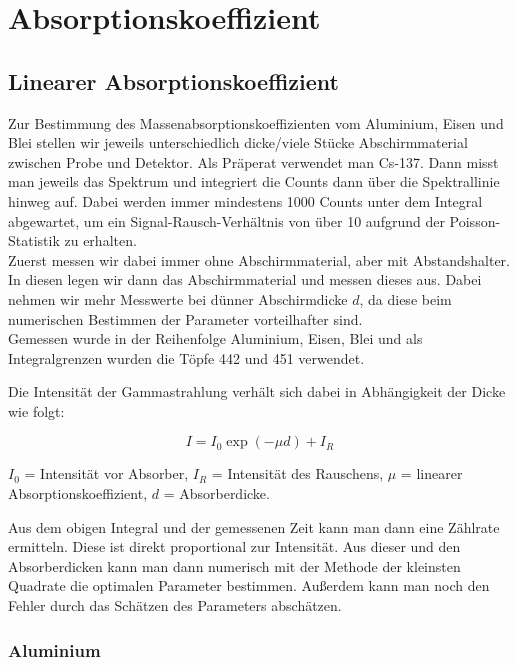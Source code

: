 \clearpage
\section{Absorptionskoeffizient}
\label{section:Absorbtionskoeff}

\subsection{Linearer Absorptionskoeffizient}

Zur Bestimmung des Massenabsorptionskoeffizienten vom Aluminium, Eisen und Blei stellen wir jeweils 
unterschiedlich dicke/viele Stücke Abschirmmaterial zwischen Probe und Detektor. Als Präperat verwendet man Cs-137. Dann misst man jeweils das Spektrum und 
integriert die Counts dann über die Spektrallinie hinweg auf. Dabei werden immer mindestens 1000 Counts unter dem Integral abgewartet, 
um ein Signal-Rausch-Verhältnis von über 10 aufgrund der Poisson-Statistik zu erhalten. \\
Zuerst messen wir dabei immer ohne Abschirmmaterial, aber mit Abstandshalter. In diesen legen wir dann das Abschirmmaterial und messen dieses aus. 
Dabei nehmen wir mehr Messwerte bei dünner Abschirmdicke $d$, da diese beim numerischen Bestimmen der Parameter vorteilhafter sind. \\
Gemessen wurde in der Reihenfolge Aluminium, Eisen, Blei und als Integralgrenzen wurden die Töpfe 442 und 451 verwendet.

Die Intensität der Gammastrahlung verhält sich dabei in Abhängigkeit der Dicke wie folgt:

\begin{equation}
    I = I_0 \exp(- \mu d) +I_R
    \label{Intensitaet}
\end{equation}

$I_0$ = Intensität vor Absorber, $I_R$ = Intensität des Rauschens, $\mu$ = linearer Absorptionskoeffizient, $d$ = Absorberdicke. 

Aus dem obigen Integral und der gemessenen Zeit kann man dann eine Zählrate ermitteln. Diese ist direkt proportional zur Intensität. 
Aus dieser und den Absorberdicken kann man dann numerisch mit der Methode der kleinsten Quadrate die optimalen Parameter bestimmen. Außerdem kann man 
noch den Fehler durch das Schätzen des Parameters abschätzen.\\

\subsubsection*{Aluminium}

